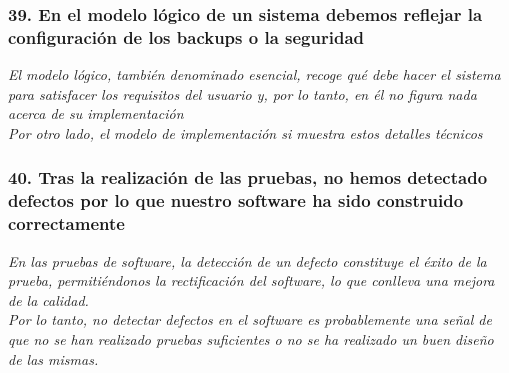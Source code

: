 \subsubsection*{39. En el modelo lógico de un sistema debemos reflejar la configuración de los backups o la seguridad}
\textit{El modelo lógico, también denominado esencial, recoge qué debe hacer el sistema para satisfacer los requisitos del usuario y, por lo tanto, en él no figura nada acerca de su implementación\\
    Por otro lado, el modelo de implementación si muestra estos detalles técnicos}

\subsubsection*{40. Tras la realización de las pruebas, no hemos detectado defectos por lo que nuestro software ha sido construido correctamente}
\textit{En las pruebas de software, la detección de un defecto constituye el éxito de la prueba, permitiéndonos la rectificación del software, lo que conlleva una mejora de la calidad.\\
    Por lo tanto, no detectar defectos en el software es probablemente una señal de que no se han realizado pruebas suficientes o no se ha realizado un buen diseño de las mismas.
}